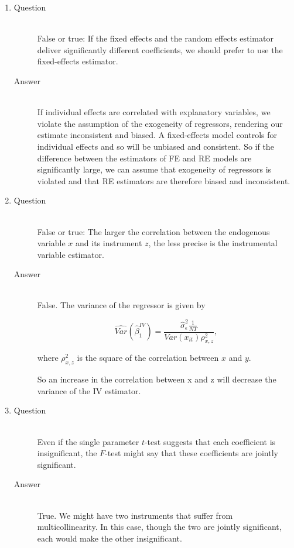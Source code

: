 \documentclass{article}
\begin{document}
\begin{enumerate}
  \item
  \begin{description}
    \item[Question] \hfill \\
    False or true: If the fixed effects and the random effects estimator deliver significantly different coefficients, we should prefer to use the fixed-effects estimator.
    \item[Answer] \hfill \\
    If individual effects are correlated with explanatory variables, we violate the assumption of the exogeneity of regressors, rendering our estimate inconsistent and biased. A fixed-effects model controls for individual effects and so will be unbiased and consistent. So if the difference between the estimators of FE and RE models are significantly large, we can assume that exogeneity of regressors is violated and that RE estimators are therefore biased and inconsistent.
    
  \end{description}
  
  \item
  \begin{description}
    \item[Question] \hfill \\
    False or true: The larger the correlation between the endogenous variable \(x\) and its instrument \(z\), the less precise is the instrumental variable estimator.
    \item[Answer] \hfill \\
    False. The variance of the regressor is given by
    
    \[ \hat{Var}(\hat{\beta}^{IV}_{1}) = \frac{\hat{\sigma}^2_{\epsilon}\frac{1}{NT}}{Var(x_{it})\rho^2_{x,z}},  \]
    
    where \(\rho^2_{x,z}\) is the square of the correlation between \( x \) and \( y \).
    
    So an increase in the correlation between x and z will decrease the variance of the IV estimator.
  \end{description}
  
  \item
  \begin{description}
    \item[Question] \hfill \\
    Even if the single parameter \(t\)-test suggests that each coefficient is insignificant, the \(F\)-test might say that these coefficients are jointly significant.
    \item[Answer] \hfill \\
    True. We might have two instruments that suffer from multicollinearity. In this case, though the two are jointly significant, each would make the other insignificant.
  \end{description}
\end{enumerate}
  
\end{document}
